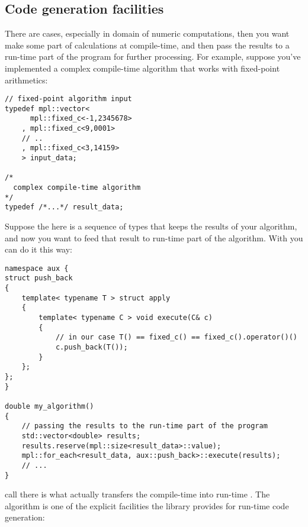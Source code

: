 \documentclass{kapproc}
\begin{document}
\subsection{Code generation facilities}

There are cases, especially in domain of numeric computations, then 
you want make some part of calculations at compile-time, and then 
pass the results to a run-time part of the program for further 
processing. For example, suppose you've implemented a complex 
compile-time algorithm that works with fixed-point arithmetics:

{\small
\begin{codesamp}\begin{verbatim}
// fixed-point algorithm input
typedef mpl::vector<
      mpl::fixed_c<-1,2345678>
    , mpl::fixed_c<9,0001>
    // ..
    , mpl::fixed_c<3,14159>
    > input_data;

/*
  complex compile-time algorithm 
*/
typedef /*...*/ result_data;
\end{verbatim}
\end{codesamp}
}

Suppose the  here is a sequence of 
 types that keeps the results of your 
algorithm, and now you want to feed that result to run-time part 
of the algorithm. With  you can do it this way:

{\small
\begin{codesamp}\begin{verbatim}
namespace aux {
struct push_back
{
    template< typename T > struct apply
    {
        template< typename C > void execute(C& c)
        {
            // in our case T() == fixed_c() == fixed_c().operator()()
            c.push_back(T());
        }
    };
};
}

double my_algorithm()
{
    // passing the results to the run-time part of the program
    std::vector<double> results;
    results.reserve(mpl::size<result_data>::value);
    mpl::for_each<result_data, aux::push_back>::execute(results);
    // ...
}
\end{verbatim}
\end{codesamp}
}

 call there is what actually 
transfers the compile-time  into run-time 
. The  algorithm 
is one of the explicit facilities the library provides for run-time 
code generation:
\end{document}
